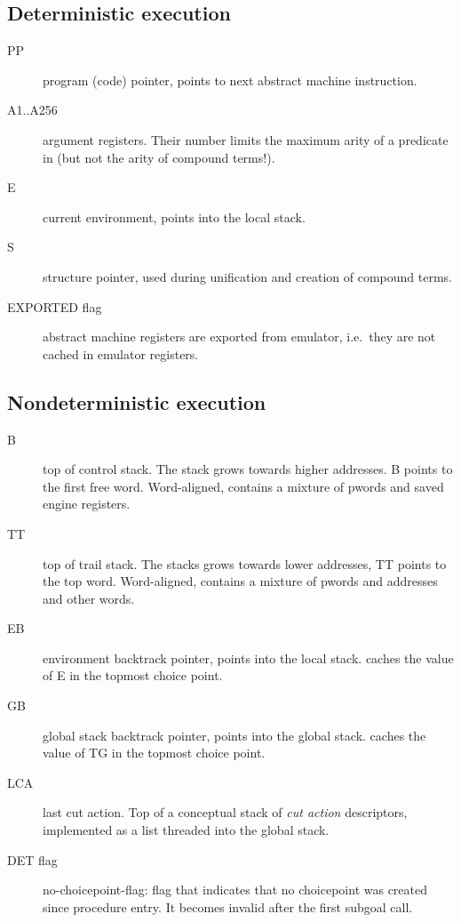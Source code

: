 \subsection{Deterministic execution}
\begin{description}
\item[PP] program (code) pointer, points to next abstract machine instruction.
\item[A1..A256] argument registers. Their number limits the maximum
        arity of a predicate in \eclipse (but not the arity of
        compound terms!).
\item[E] current environment, points into the local stack.
\item[S] structure pointer, used during unification and creation of
        compound terms.
\item[EXPORTED flag] abstract machine registers are exported from emulator,
        i.e.\ they are not cached in emulator registers.
\end{description}


\subsection{Nondeterministic execution}
\begin{description}
\item[B] top of control stack. The stack grows towards higher addresses.
        B points to the first free word. Word-aligned, contains a mixture
        of pwords and saved engine registers.
\item[TT] top of trail stack. The stacks grows towards lower addresses,
        TT points to the top word. Word-aligned, contains a mixture
        of pwords and addresses and other words.
\item[EB] environment backtrack pointer, points into the local stack.
        caches the value of E in the topmost choice point.
\item[GB] global stack backtrack pointer, points into the global stack.
        caches the value of TG in the topmost choice point.
\item[LCA] last cut action. Top of a conceptual stack of {\it cut action}
        descriptors, implemented as a list threaded into the global stack.
\item[DET flag] no-choicepoint-flag: flag that indicates that
        no choicepoint was created since procedure entry. It becomes invalid
        after the first subgoal call.
\end{description}


